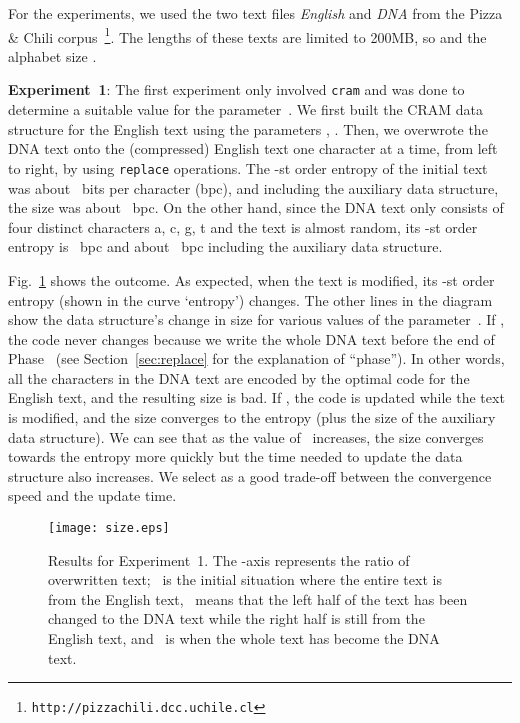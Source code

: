 \documentclass{llncs}
\begin{document}
\noindent
For the experiments, we used the two text files \emph{English} and \emph{DNA}
from the Pizza \& Chili
corpus~\footnote{\texttt{http://pizzachili.dcc.uchile.cl}}.
The lengths of these texts are limited to 200MB, so 
and the alphabet size .

\bigskip

\noindent
\textbf{Experiment~1}:
The first experiment only involved \texttt{cram} and was done to determine
a suitable value for the parameter~.
We first built the CRAM data structure for the English text using the
parameters , .
Then, we overwrote the DNA text onto the (compressed) English text one
character at a time, from left to right, by using \texttt{replace}
operations.
The -st order entropy of the initial text was about ~bits per
character (bpc), and including the auxiliary data structure, the size was
about ~bpc.
On the other hand, since the DNA text only consists of four distinct
characters a, c, g, t and the text is almost random,
its -st order entropy is ~bpc and
about ~bpc including the auxiliary data structure.

Fig.~\ref{fig:size} shows the outcome.
As expected, when the text is modified, its -st order entropy (shown in
the curve `entropy') changes.
The other lines in the diagram show the data structure's change in size for
various values of the parameter~.
If , the code never changes because we write the whole DNA text
before the end of Phase~ (see Section~\ref{sec:replace} for the
explanation of ``phase'').
In other words, all the characters in the DNA text are encoded by the optimal
code for the English text, and the resulting size is bad.
If , the code is updated while the text is modified, and the size
converges to the entropy (plus the size of the auxiliary data structure).
We can see that as the value of~ increases, the size converges towards
the entropy more quickly but the time needed to update the data structure
also increases.
We select  as a good trade-off between the convergence speed and the
update time.


\begin{figure}[t!]
\begin{center}
  \texttt{[image: size.eps]}
\caption{Results for Experiment~1.
The -axis represents the ratio of overwritten text;
~is the initial situation where the entire text is from the English
text, ~means that the left half of the text has been changed to the DNA
text while the right half is still from the English text, and ~is
when the whole text has become the DNA text.}
\label{fig:size}
\end{center}
\end{figure}
\end{document}
